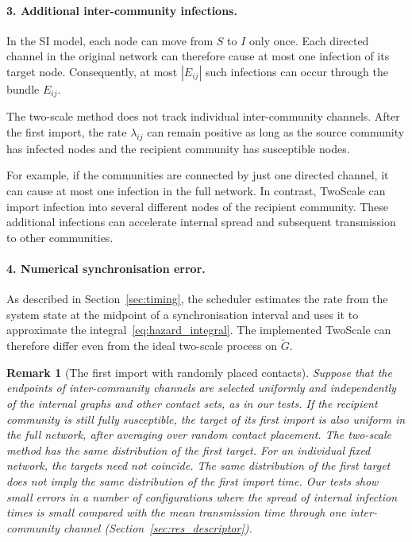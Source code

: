 \documentclass{ieeeaccess}
\newtheorem{remark}{Remark}
\newcommand{\TS}{\textup{TwoScale}}
\begin{document}
\paragraph{3. Additional inter-community infections.}
In the SI model, each node can move from $S$ to $I$ only once. Each directed channel in the original network can therefore cause at most one infection of its target node. Consequently, at most $|E_{ij}|$ such infections can occur through the bundle $E_{ij}$.

The two-scale method does not track individual inter-community channels. After the first import, the rate $\lambda_{ij}$ can remain positive as long as the source community has infected nodes and the recipient community has susceptible nodes.

For example, if the communities are connected by just one directed channel, it can cause at most one infection in the full network. In contrast, \TS{} can import infection into several different nodes of the recipient community. These additional infections can accelerate internal spread and subsequent transmission to other communities.

\paragraph{4. Numerical synchronisation error.}
As described in Section~\ref{sec:timing}, the scheduler estimates the rate from the system state at the midpoint of a synchronisation interval and uses it to approximate the integral~\eqref{eq:hazard_integral}. The implemented \TS{} can therefore differ even from the ideal two-scale process on $\tilde G$.

\begin{remark}[The first import with randomly placed contacts]
\label{rem:placement}
Suppose that the endpoints of inter-community channels are selected uniformly and independently of the internal graphs and other contact sets, as in our tests. If the recipient community is still fully susceptible, the target of its first import is also uniform in the full network, after averaging over random contact placement. The two-scale method has the same distribution of the first target. For an individual fixed network, the targets need not coincide. The same distribution of the first target does not imply the same distribution of the first import time. Our tests show small errors in a number of configurations where the spread of internal infection times is small compared with the mean transmission time through one inter-community channel (Section~\ref{sec:res_descriptor}).
\end{remark}
\end{document}
